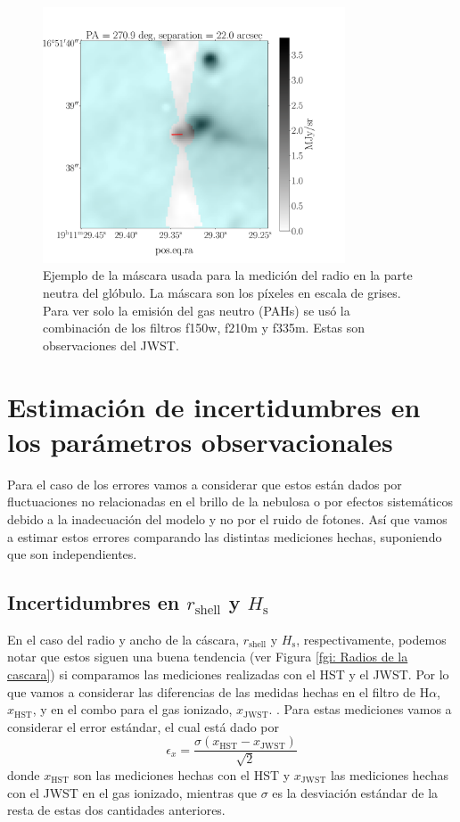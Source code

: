 \documentclass{book}
\begin{document}
\begin{figure}[htb]
    \centering
    \includegraphics[width=0.8\textwidth]{Nuevas imagenes finales/r_0_.pdf}
    \caption{Ejemplo de la máscara usada para la medición del radio en la parte neutra del glóbulo. La máscara son los píxeles en escala de grises. Para ver solo la emisión del gas neutro (PAHs) se usó la combinación de los filtros f150w, f210m y f335m. Estas son observaciones del JWST.}
    \label{Medicion de r_0}
\end{figure}

\section[Errores observacionales]{Estimación de incertidumbres en los parámetros observacionales}

Para el caso de los errores vamos a considerar que estos están dados por fluctuaciones no relacionadas en el brillo de la nebulosa o por efectos  sistemáticos debido a la inadecuación del modelo y no por el ruido de fotones. Así que vamos a estimar estos errores comparando las distintas mediciones hechas, suponiendo que son independientes.

\subsection{\boldmath Incertidumbres en $r_\mathrm{shell}$ y $H_\mathrm{s}$}

En el caso del radio y ancho de la cáscara, $r_\mathrm{shell}$ y $H_\mathrm{s}$, respectivamente, podemos notar que estos siguen una buena tendencia (ver Figura \ref{fgi: Radios de la cascara}) si comparamos las mediciones realizadas con el HST y el JWST. Por lo que vamos a considerar las diferencias de las medidas hechas en el filtro de H$\alpha$, $x_\mathrm{HST}$, y en el combo para el gas ionizado, $x_\mathrm{JWST}$. 
. Para estas mediciones vamos a considerar el error estándar, el cual está dado por
\begin{equation}
\epsilon_x = \frac{\sigma(x_\mathrm{HST}-x_\mathrm{JWST})}{\sqrt{2}}     
\end{equation}
donde $x_\mathrm{HST}$ son las mediciones hechas con el HST y $x_\mathrm{JWST}$ las mediciones hechas con el JWST en el gas ionizado, mientras que $\sigma$ es la desviación estándar de la resta de estas dos cantidades anteriores. 
\end{document}
